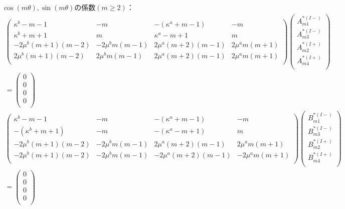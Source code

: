 \newpage
$\cos(m\theta),\sin(m\theta)$の係数$(m\geq2)$：
\begin{align}
	\left(
	\begin{array}{cccc}
		\kappa^b-m-1& -m & -(\kappa^a+m-1) & -m \\
		\kappa^b+m+1 & m & \kappa^a-m+1 & m \\
		-2\mu^{b}(m+1)(m-2) & -2\mu^{b}m(m-1) &
		2\mu^{a}(m+2)(m-1) & 2\mu^{a}m(m+1) \\
		2\mu^{b}(m+1)(m-2) & 2\mu^{b}m(m-1) &
		2\mu^{a}(m+2)(m-1) & 2\mu^{a}m(m+1) \\
	\end{array}
	\right)
	\left(
	\begin{array}{c}
		A_{m1}^{*(I-)} \\
	 	A_{m3}^{*(I-)} \\
		A_{m2}^{*(I+)}\\
	 	A_{m4}^{*(I+)} \\
	\end{array}
	\right)
	\nonumber
	\\
	=
	\left(
	\begin{array}{c}
		0 \\
	 	0 \\
		0 \\
	 	0 \\
	\end{array}
	\right)
\end{align}
\begin{align}
	\left(
	\begin{array}{cccc}
		\kappa^b-m-1& -m & -(\kappa^a+m-1) & -m \\
		-(\kappa^b+m+1) & -m & -(\kappa^a-m+1) & m \\
		-2\mu^{b}(m+1)(m-2) & -2\mu^{b}m(m-1) &
		2\mu^{a}(m+2)(m-1) & 2\mu^{a}m(m+1) \\
		-2\mu^{b}(m+1)(m-2) & -2\mu^{b}m(m-1) &
		-2\mu^{a}(m+2)(m-1) & -2\mu^{a}m(m+1) \\
	\end{array}
	\right)
	\left(
	\begin{array}{c}
		B_{m1}^{*(I-)} \\
	 	B_{m3}^{*(I-)} \\
		B_{m2}^{*(I+)}\\
	 	B_{m4}^{*(I+)} \\
	\end{array}
	\right)
	\nonumber
	\\
	=
	\left(
	\begin{array}{c}
		0 \\
	 	0 \\
		0 \\
	 	0 \\
	\end{array}
	\right)
\end{align}
